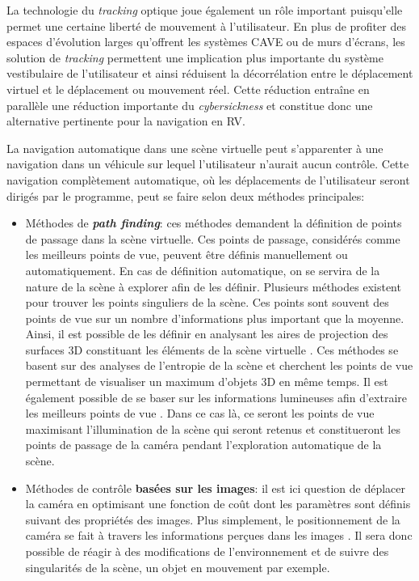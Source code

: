 La technologie du \textit{tracking} optique joue également un rôle important puisqu'elle permet une certaine liberté de mouvement à l'utilisateur. En plus de profiter des espaces d'évolution larges qu'offrent les systèmes CAVE ou de murs d'écrans, les solution de \textit{tracking} permettent une implication plus importante du système vestibulaire de l'utilisateur et ainsi réduisent la décorrélation entre le déplacement virtuel et le déplacement ou mouvement réel. Cette réduction entraîne en parallèle une réduction importante du \textit{cybersickness} et constitue donc une alternative pertinente pour la navigation en RV.


La navigation automatique dans une scène virtuelle peut s'apparenter à une navigation dans un véhicule sur lequel l'utilisateur n'aurait aucun contrôle. Cette navigation complètement automatique, où les déplacements de l'utilisateur seront dirigés par le programme, peut se faire selon deux méthodes principales:

\begin{itemize}
  \item Méthodes de \textit{\textbf{path finding}}: ces méthodes demandent la définition de points de passage dans la scène virtuelle. Ces points de passage, considérés comme les meilleurs points de vue, peuvent être définis manuellement ou automatiquement. En cas de définition automatique, on se servira de la nature de la scène à explorer afin de les définir. Plusieurs méthodes existent pour trouver les points singuliers de la scène. Ces points sont souvent des points de vue sur un nombre d'informations plus important que la moyenne. Ainsi, il est possible de les définir en analysant les aires de projection des surfaces 3D constituant les éléments de la scène virtuelle \cite{vazquez2001viewpoint}. Ces méthodes se basent sur des analyses de l'entropie de la scène et cherchent les points de vue permettant de visualiser un maximum d'objets 3D en même temps. Il est également possible de se baser sur les informations lumineuses afin d'extraire les meilleurs points de vue \cite{gumhold2002maximum}. Dans ce cas là, ce seront les points de vue maximisant l'illumination de la scène qui seront retenus et constitueront les points de passage de la caméra pendant l'exploration automatique de la scène.
  \item Méthodes de contrôle \textbf{basées sur les images}: il est ici question de déplacer la caméra en optimisant une fonction de coût dont les paramètres sont définis suivant des propriétés des images. Plus simplement, le positionnement de la caméra se fait à travers les informations perçues dans les images \cite{courty2001computer}. Il sera donc possible de réagir à des modifications de l'environnement et de suivre des singularités de la scène, un objet en mouvement par exemple. 
\end{itemize}

